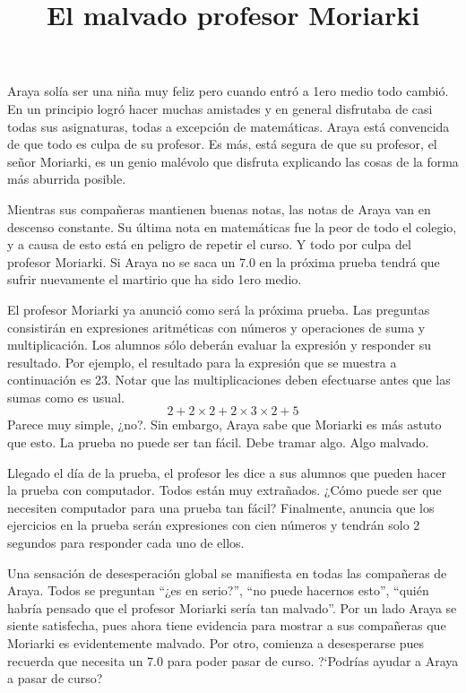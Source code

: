 \documentclass{oci}
\title{El malvado profesor Moriarki}
\begin{document}
\begin{problemDescription}
Araya solía ser una niña muy feliz pero cuando entró a 1ero medio todo cambió.
En un principio logró hacer muchas amistades y en general disfrutaba de casi todas
sus asignaturas, todas a excepción de matemáticas.
Araya está convencida de que todo es culpa de su profesor.
Es más, está segura de que su profesor, el señor Moriarki, es un genio malévolo
que disfruta explicando las cosas de la forma más aburrida posible.

Mientras sus compañeras mantienen buenas notas, las notas de Araya van en
descenso constante.
Su última nota en matemáticas fue la peor de todo el colegio, y a causa de esto
está en peligro de repetir el curso.
Y todo por culpa del profesor Moriarki.
Si Araya no se saca un 7.0 en la próxima prueba tendrá que sufrir nuevamente el
martirio que ha sido 1ero medio.

El profesor Moriarki ya anunció como será la próxima prueba.
Las preguntas consistirán en expresiones aritméticas con números y operaciones
de suma y multiplicación.
Los alumnos sólo deberán evaluar la expresión y responder su resultado.
Por ejemplo, el resultado para la expresión que se muestra a continuación es 23.
Notar que las multiplicaciones deben efectuarse antes que las sumas como es usual.
$$
2 + 2 \times 2 + 2\times 3 \times 2 + 5
$$
Parece muy simple, ¿no?.
Sin embargo, Araya sabe que Moriarki es más astuto que 	esto.
La prueba no puede ser tan fácil.
Debe tramar algo.
Algo malvado.

Llegado el día de la prueba, el profesor les dice a sus alumnos que pueden hacer
la prueba con computador.
Todos están muy extrañados.
¿Cómo puede ser que necesiten computador para una prueba tan fácil?
Finalmente, anuncia que los ejercicios en la prueba serán expresiones con cien
números y tendrán solo 2 segundos para responder cada uno de ellos.

Una sensación de desesperación global se manifiesta en todas las compañeras de
Araya.
Todos se preguntan ``¿es en serio?'', ``no puede hacernos esto'', ``quién
habría pensado que el profesor Moriarki sería tan malvado''.
Por un lado Araya se siente satisfecha, pues ahora tiene evidencia para mostrar a sus
compañeras que Moriarki es evidentemente malvado.
Por otro, comienza a desesperarse pues recuerda que necesita un 7.0 para poder
pasar de curso.
?`Podrías ayudar a Araya a pasar de curso?


\end{problemDescription}
\end{document}
